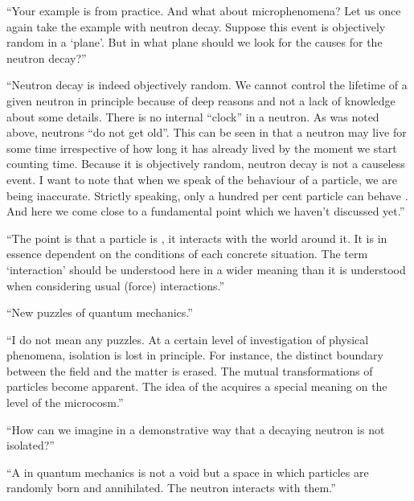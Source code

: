 \begin{dialogue}
\rdr ``Your example is from practice. And what about
microphenomena? Let us once again take the example with neutron
decay. Suppose this event is objectively random in a `plane'. But in
what plane should we look for the causes for the neutron decay?''

\athr ``Neutron decay is indeed objectively random. We cannot
control the lifetime of a given neutron in principle because of deep
reasons and not a lack of knowledge about some details. There is no
internal ``clock'' in a neutron. As was noted above, neutrons ``do not
get old''. This can be seen in that a neutron may live for some time
irrespective of how long it has already lived by the moment we start
counting time. Because it is objectively random, neutron decay is not
a causeless event. I want to note that when we speak of the
 behaviour of a particle, we are being inaccurate. Strictly speaking, only a hundred per cent  particle can behave . And here we come close to a fundamental point which we haven't discussed yet.''

``The point is that a particle is , it interacts with the
world around it. It is in essence dependent on the conditions of each
concrete situation. The term `interaction' should be understood here
in a wider meaning than it is understood when considering usual
(force) interactions.''

\rdr ``New puzzles of quantum mechanics.''

\athr ``I do not mean any puzzles. At a certain level of investigation of physical phenomena, isolation is lost in principle. For instance, the distinct boundary between the field and the matter is erased. The mutual transformations of particles become apparent. The idea of the  acquires a special meaning on the level of the microcosm.''

\rdr ``How can we imagine in a demonstrative way that a decaying neutron is not isolated?''

\athr ``A  in quantum mechanics is not a void but a space in which particles are randomly born and annihilated. The neutron interacts with them.''
\end{dialogue}

